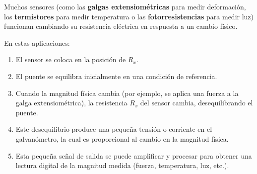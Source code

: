\documentclass[12pt,a4paper]{article}
\begin{document}
Muchos sensores (como las \textbf{galgas extensiométricas} para medir deformación, los \textbf{termistores} para medir temperatura o las \textbf{fotorresistencias} para medir luz) funcionan cambiando su resistencia eléctrica en respuesta a un cambio físico.

En estas aplicaciones:
\begin{enumerate}
    \item El sensor se coloca en la posición de $R_x$.
    \item El puente se equilibra inicialmente en una condición de referencia.
    \item Cuando la magnitud física cambia (por ejemplo, se aplica una fuerza a la galga extensiométrica), la resistencia $R_x$ del sensor cambia, desequilibrando el puente.
    \item Este desequilibrio produce una pequeña tensión o corriente en el galvanómetro, la cual es proporcional al cambio en la magnitud física.
    \item Esta pequeña señal de salida se puede amplificar y procesar para obtener una lectura digital de la magnitud medida (fuerza, temperatura, luz, etc.).
\end{enumerate}
\end{document}
